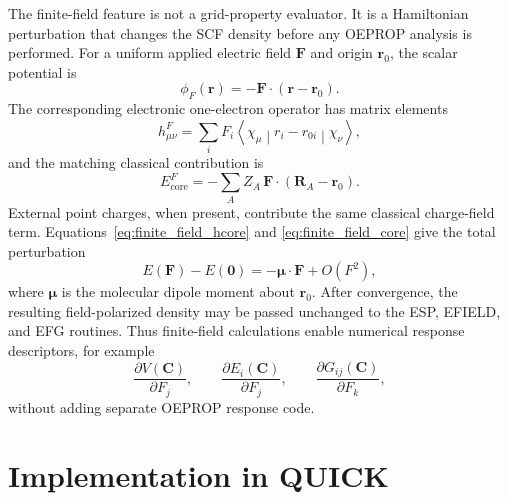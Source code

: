 \documentclass[journal=jcisd8,manuscript=article]{achemso}
\begin{document}
The finite-field feature is not a grid-property evaluator.  It is a Hamiltonian perturbation that changes the SCF density before any OEPROP analysis is performed.  For a uniform applied electric field \(\mathbf{F}\) and origin \(\mathbf{r}_0\), the scalar potential is
\begin{equation}
  \phi_F(\mathbf{r})
  =
  -\mathbf{F}\cdot(\mathbf{r}-\mathbf{r}_0).
\end{equation}
The corresponding electronic one-electron operator has matrix elements
\begin{equation}
  h^F_{\mu\nu}
  =
  \sum_i F_i
  \left\langle
    \chi_\mu
    \middle|
    r_i-r_{0i}
    \middle|
    \chi_\nu
  \right\rangle,
  \label{eq:finite_field_hcore}
\end{equation}
and the matching classical contribution is
\begin{equation}
  E^F_{\mathrm{core}}
  =
  -\sum_A Z_A\,\mathbf{F}\cdot(\mathbf{R}_A-\mathbf{r}_0).
  \label{eq:finite_field_core}
\end{equation}
External point charges, when present, contribute the same classical charge-field term.  Equations~\ref{eq:finite_field_hcore} and \ref{eq:finite_field_core} give the total perturbation
\begin{equation}
  E(\mathbf{F})-E(\mathbf{0})
  =
  -\boldsymbol{\mu}\cdot\mathbf{F}
  + O(F^2),
\end{equation}
where \(\boldsymbol{\mu}\) is the molecular dipole moment about \(\mathbf{r}_0\).  After convergence, the resulting field-polarized density may be passed unchanged to the ESP, EFIELD, and EFG routines.  Thus finite-field calculations enable numerical response descriptors, for example
\[
  \frac{\partial V(\mathbf{C})}{\partial F_j},\qquad
  \frac{\partial E_i(\mathbf{C})}{\partial F_j},\qquad
  \frac{\partial G_{ij}(\mathbf{C})}{\partial F_k},
\]
without adding separate OEPROP response code.

\section{Implementation in QUICK}
\end{document}
